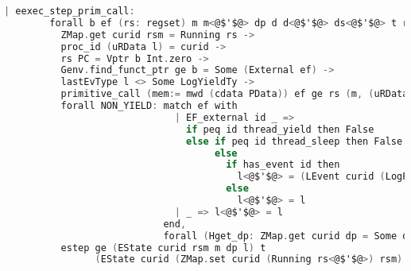 \begin{lstlisting}[language=C]
    | eexec_step_prim_call:
        forall b ef (rs: regset) m m<@$'$@> dp d d<@$'$@> ds<@$'$@> t rs<@$'$@> curid rsm l l<@$'$@>,
          ZMap.get curid rsm = Running rs ->
          proc_id (uRData l) = curid ->
          rs PC = Vptr b Int.zero ->
          Genv.find_funct_ptr ge b = Some (External ef) ->
          lastEvType l <> Some LogYieldTy ->
          primitive_call (mem:= mwd (cdata PData)) ef ge rs (m, (uRData l, d)) t rs<@$'$@> (m<@$'$@>, (ds<@$'$@>, d<@$'$@>)) ->
          forall NON_YIELD: match ef with
                              | EF_external id _ => 
                                if peq id thread_yield then False
                                else if peq id thread_sleep then False
                                     else
                                       if has_event id then
                                         l<@$'$@> = (LEvent curid (LogPrim id nil 0 (snap_func d)) :: l)
                                       else
                                         l<@$'$@> = l
                              | _ => l<@$'$@> = l
                            end,
                            forall (Hget_dp: ZMap.get curid dp = Some d),
          estep ge (EState curid rsm m dp l) t 
                (EState curid (ZMap.set curid (Running rs<@$'$@>) rsm) m<@$'$@> (ZMap.set curid (Some d<@$'$@>) dp) l<@$'$@>)
\end{lstlisting}

